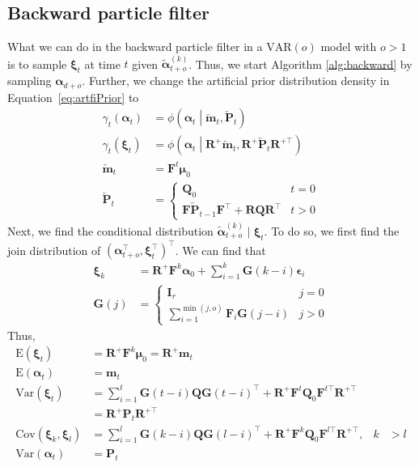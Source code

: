 \documentclass[notitlepage]{article}
\renewcommand{\vec}[1]{\bm{#1}}
\newcommand{\vecLarrow}[1]{\overleftarrow{\vec{#1}}}
\newcommand{\mat}[1]{\mathbf{#1}}
\newcommand{\matLarrow}[1]{\overleftarrow{\mat{#1}}}
\newcommand{\Lparen}[1]{\left( #1\right)}
\newcommand{\Cond}[2]{ #1 \middle\vert  #2}
\newcommand{\VAR}{\text{Var}}
\newcommand{\E}{\text{E}}
\newcommand{\COV}{\text{Cov}}
\newcommand{\optor}[2]{#1\Lparen{#2}}
\newcommand{\optorC}[3]{\optor{#1}{\Cond{#2}{#3}}}
\newcommand{\expec}[1]{\optor{\E}{#1}}
\newcommand{\varp}[1]{\optor{\VAR}{#1}}
\newcommand{\covp}[1]{\optor{\COV}{#1}}
\newcommand{\normaldC}[3]{\optorC{\phi}{#1}{#2,#3}}
\newcommand{\particB}[3]{\widetilde{#1}_{#2}^{\Lparen{#3}}}
\newcommand{\dimRng}{r}
\newcommand\MVAR[1]{\optor{\text{VAR}}{#1}}
\begin{document}
\subsection{Backward particle filter}
What we can do in the backward particle filter in a $\MVAR{o}$ model with $o > 1$ is to 
sample $\vec\xi_t$ at 
time $t$ given $\particB{\vec\alpha}{t + o}k$. Thus, we start Algorithm \ref{alg:backward} by 
sampling $\vec\alpha_{d + o}$. 
Further, we change the artificial 
prior distribution density in Equation~\eqref{eq:artfiPrior} to %
%
\begin{align*}
	\gamma_t\Lparen{\vec{\alpha}_t} &=
		\normaldC{\vec{\alpha}_t}{\vecLarrow{m}_t}{\matLarrow{P}_t} \\
	\gamma_t\Lparen{\vec\xi_t} &= 
		\normaldC{\vec{\alpha}_t}{\mat R^+\vecLarrow{m}_t}{
			\mat R^+\matLarrow{P}_t\mat R^{+\top}} \\
%
	\vecLarrow{m}_t &= \mat{F}^t\vec\mu_0 \\
%
	\matLarrow{P}_t &= \left\{
		\begin{matrix} \mat{Q}_0 & t = 0 \\ \mat{F}\matLarrow{P}_{t - 1}\mat{F}^\top + 
		\mat R\mat Q\mat R^\top & t > 0   \end{matrix} \right.
\end{align*}%
%
Next, we find the conditional distribution $\particB{\vec\alpha}{t + o}k \mid \vec\xi_t$. 
To do so, we first find the join distribution of %
$(\vec \alpha_{t + o}^\top, \vec \xi_t^\top)^\top$.  We can find that%
%
\begin{align*}
\vec\xi_k &= 
	\mat R^+\mat F^k \vec\alpha_0 + \sum_{i = 1}^k \mat G(k - i) \vec\epsilon_i \\
\mat G(j) &= \left\{ \begin{matrix}
	\mat I_\dimRng & j = 0 \\
	\sum_{i = 1}^{\min (j, o)} \mat F_i \mat G(j - i) & j > 0
\end{matrix}\right.
\end{align*}
% 
Thus, %
%
\begin{align*}
\expec{\vec\xi_t} &= \mat R^+\mat F^k\vec\mu_0 = \mat R^+\vec m_t \\
\expec{\vec\alpha_t} &= \vec m_t \\
\varp{\vec\xi_t} &= \sum_{i = 1}^t \mat G(t - i) \mat Q \mat G(t - i)^\top + 
	\mat R^+\mat F^t\mat Q_0 \mat F^{t\top}\mat R^{+\top} \\ 
	&= \mat R^+\mat P_t \mat R^{+\top} \\
\covp{\vec\xi_k, \vec\xi_l} &= 
	\sum_{i = 1}^l\mat G(k - i)\mat Q \mat G(l - i)^\top
	+ \mat R^+\mat F^k\mat Q_0\mat F^{l\top}\mat R^{+\top}, 
	& k &> l \\
\varp{\vec\alpha_t} &= \mat P_t 
\end{align*}%
\end{document}
